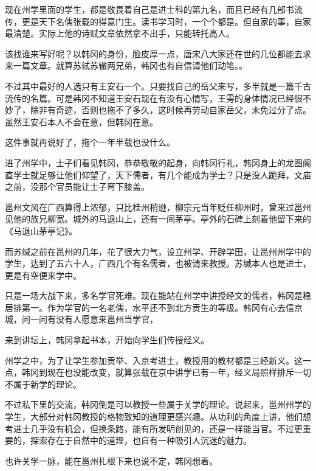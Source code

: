 现在州学里面的学生，都是敬畏着自己是进士科的第九名，而且已经有几部书流传，更是天下名儒张载的得意门生。读书学习时，一个个都是。但自家的事，自家最清楚。实际上他的诗赋文章依然拿不出手，只能转托高人。

该找谁来写好呢？以韩冈的身份，脸皮厚一点，唐宋八大家还在世的几位都能去求来一篇文章。就算苏轼苏辙两兄弟，韩冈也有自信请他们动笔。。

不过其中最好的人选只有王安石一个。只要找自己的岳父来写，多半就是一篇千古流传的名篇。可是韩冈不知道王安石现在有没有心情写，王雱的身体情况已经很不妙了，除非有奇迹，否则也拖不了多久，这时候再劳动自家岳父，未免过分了点。虽然王安石本人不会在意，但韩冈在意。

这件事就再说好了，拖个一年半载也没什么。

进了州学中，士子们看见韩冈，恭恭敬敬的起身，向韩冈行礼，韩冈身上的龙图阁直学士就足够让他们仰望了，天下儒者，有几个能成为学士？只是没人跪拜，文庙之前，没那个官员能让士子弯下膝盖。

邕州文风在广西算得上浓郁，只比桂州稍逊，柳宗元当年贬任柳州时，曾来过邕州见他的族兄柳宽。城外的马退山上，还有一间茅亭。亭外的石碑上刻着他留下来的《马退山茅亭记》。

而苏缄之前在邕州的几年，花了很大力气，设立州学、开辟学田，让邕州州学中的学生，达到了五六十人，广西几个有名儒者，也被请来教授。苏缄本人也是进士，更是有空便来学中。

只是一场大战下来，多名学官死难。现在能站在州学中讲授经文的儒者，韩冈是稳居排第一。作为学官的一名老儒，水平还不到北方贡生的等级。韩冈有心去信京城，问一问有没有人愿意来邕州当学官，

来到讲坛上，韩冈拿起书本，开始向学生们传授经义。

州学之中，为了让学生参加贡举、入京考进士，教授用的教材都是三经新义。这一点，韩冈到现在也没能改变，就算张载在京中讲学已有一年，经义局照样排斥一切不属于新学的理论。

不过私下里的交流，韩冈倒是可以教授一些属于关学的理论。说起来，邕州州学的学生，大部分对韩冈教授的格物致知的道理更感兴趣。从功利的角度上讲，他们想考进士几乎没有机会，但换条路，能有所发明创见的，还是一样能当官。不过更重要的，探索存在于自然中的道理，也自有一种吸引人沉迷的魅力。

也许关学一脉，能在邕州扎根下来也说不定，韩冈想着。

